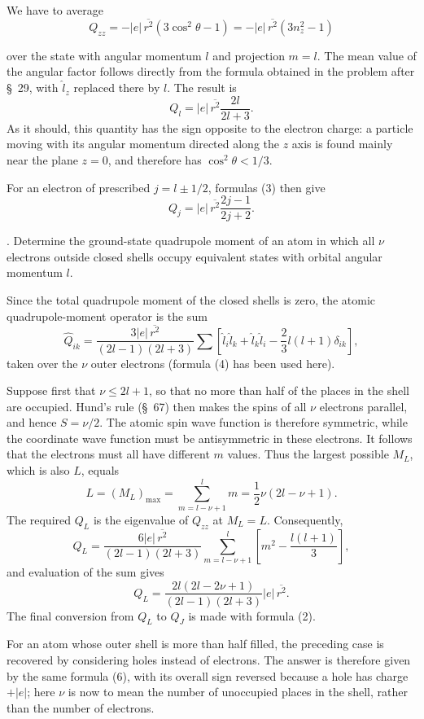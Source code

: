 \SolutionHeading We have to average
\[
 Q_{zz}=-|e|\,\overline{r^2}(3\cos^2\theta-1)=-|e|\,\overline{r^2}(3n_z^2-1)
\]

over the state with angular momentum $l$ and projection $m=l$. The mean value of the angular factor follows directly from the formula obtained in the problem after \S~29, with $\widehat l_z$ replaced there by $l$. The result is
\begin{equation}
 Q_l=|e|\,\overline{r^2}\frac{2l}{2l+3}.
 \tag{1}
\end{equation}
As it should, this quantity has the sign opposite to the electron charge: a particle moving with its angular momentum directed along the $z$ axis is found mainly near the plane $z=0$, and therefore has $\cos^2\theta<1/3$.

For an electron of prescribed $j=l\pm1/2$, formulas (3) then give
\begin{equation}
 Q_j=|e|\,\overline{r^2}\frac{2j-1}{2j+2}.
 \tag{2}
\end{equation}

. Determine the ground-state quadrupole moment of an atom in which all $\nu$ electrons outside closed shells occupy equivalent states with orbital angular momentum $l$.

\SolutionHeading Since the total quadrupole moment of the closed shells is zero, the atomic quadrupole-moment operator is the sum
\[
 \widehat Q_{ik}=\frac{3|e|\,\overline{r^2}}{(2l-1)(2l+3)}\sum\left[\widehat l_i\widehat l_k+\widehat l_k\widehat l_i-\frac23l(l+1)\delta_{ik}\right],
\]
taken over the $\nu$ outer electrons (formula (4) has been used here).

Suppose first that $\nu\leqslant2l+1$, so that no more than half of the places in the shell are occupied. Hund's rule (\S~67) then makes the spins of all $\nu$ electrons parallel, and hence $S=\nu/2$. The atomic spin wave function is therefore symmetric, while the coordinate wave function must be antisymmetric in these electrons. It follows that the electrons must all have different $m$ values. Thus the largest possible $M_L$, which is also $L$, equals
\[
 L=(M_L)_{\max}=\sum_{m=l-\nu+1}^{l}m=\frac12\nu(2l-\nu+1).
\]
The required $Q_L$ is the eigenvalue of $Q_{zz}$ at $M_L=L$. Consequently,
\[
 Q_L=\frac{6|e|\,\overline{r^2}}{(2l-1)(2l+3)}\sum_{m=l-\nu+1}^{l}\left[m^2-\frac{l(l+1)}3\right],
\]
and evaluation of the sum gives
\begin{equation}
 Q_L=\frac{2l(2l-2\nu+1)}{(2l-1)(2l+3)}|e|\,\overline{r^2}.
 \tag{1}
\end{equation}
The final conversion from $Q_L$ to $Q_J$ is made with formula (2).

For an atom whose outer shell is more than half filled, the preceding case is recovered by considering holes instead of electrons. The answer is therefore given by the same formula (6), with its overall sign reversed because a hole has charge $+|e|$; here $\nu$ is now to mean the number of unoccupied places in the shell, rather than the number of electrons.
